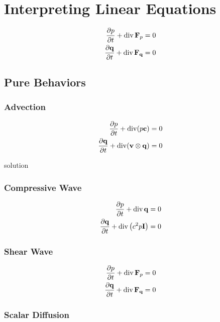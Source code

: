 \chapter{Interpreting Linear Equations}
\label{chapter:Interpreting-Linear-Equations}


\begin{align}
	\pdv{p}{t} + \operatorname{div}{\vb{F}_{p}} &= 0 \\
	\pdv{\vb{q}}{t} + \operatorname{div}{\vb{F}_{\vb{q}}} &= 0
\end{align}

\section{Pure Behaviors}

\subsection{Advection}

\begin{align}
	\pdv{p}{t} + \operatorname{div} (p \vb{c} )&= 0 \\
	\pdv{\vb{q}}{t} + \operatorname{div} (\vb{v} \otimes \vb{q}) &= 0
\end{align}

solution

\subsection{Compressive Wave}

\begin{align}
	\pdv{p}{t} + \operatorname{div}{\vb{q}} &= 0 \\
	\pdv{\vb{q}}{t} + \operatorname{div} \left( c^{2} p \vb{I} \right) &= 0
\end{align}

\subsection{Shear Wave}

\begin{align}
	\pdv{p}{t} + \operatorname{div}{\vb{F}_{p}} &= 0 \\
	\pdv{\vb{q}}{t} + \operatorname{div}{\vb{F}_{\vb{q}}} &= 0
\end{align}

\subsection{Scalar Diffusion}

